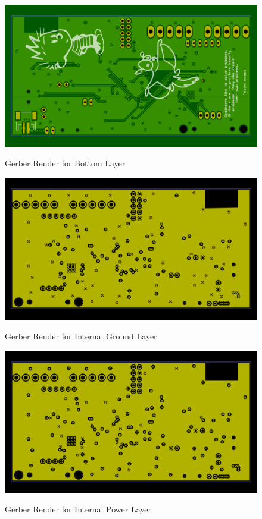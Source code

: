 \begin{figure}
\begin{center}
	\label{fig:BOTGerber}
	\includegraphics[angle=0,scale=1,width=1\textwidth]{Images/Rev5_BOTGERB.png} 
	\caption{Gerber Render for Bottom Layer}
\end{center}
\end{figure}


\begin{figure}
\begin{center}
	\label{fig:GNDGerber}
	\includegraphics[angle=0,scale=1,width=1\textwidth]{Images/Rev5_GNDGERB.png} 
	\caption{Gerber Render for Internal Ground Layer}
\end{center}
\end{figure}


\begin{figure}
\begin{center}
	\label{fig:TOPGerber}
	\includegraphics[angle=0,scale=1,width=1\textwidth]{Images/Rev5_PWRGERB.png} 
	\caption{Gerber Render for Internal Power Layer}
\end{center}
\end{figure}
